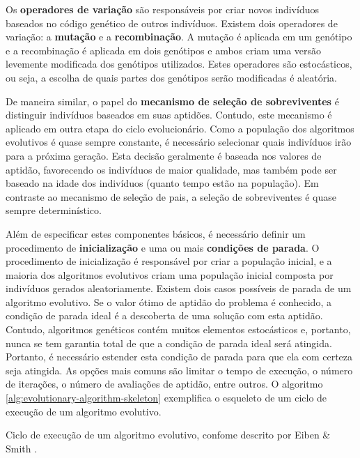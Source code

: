 Os \textbf{operadores de variação} são responsáveis por criar novos indivíduos
baseados no código genético de outros indivíduos. Existem dois operadores de
variação: a \textbf{mutação} e a \textbf{recombinação}. A mutação é aplicada em
um genótipo e a recombinação é aplicada em dois genótipos e ambos criam uma
versão levemente modificada dos genótipos utilizados. Estes operadores são
estocásticos, ou seja, a escolha de quais partes dos genótipos serão modificadas
é aleatória.

De maneira similar, o papel do \textbf{mecanismo de seleção de sobreviventes} é
distinguir indivíduos baseados em suas aptidões. Contudo, este mecanismo é
aplicado em outra etapa do ciclo evolucionário. Como a população dos algoritmos
evolutivos é quase sempre constante, é necessário selecionar quais indivíduos
irão para a próxima geração. Esta decisão geralmente é baseada nos valores de
aptidão, favorecendo os indivíduos de maior qualidade, mas também pode ser
baseado na idade dos indivíduos (quanto tempo estão na população). Em contraste
ao mecanismo de seleção de pais, a seleção de sobreviventes é quase sempre
determinístico.

Além de especificar estes componentes básicos, é necessário definir um
procedimento de \textbf{inicialização} e uma ou mais \textbf{condições de
parada}. O procedimento de inicialização é responsável por criar a população
inicial, e a maioria dos algoritmos evolutivos criam uma população inicial
composta por indivíduos gerados aleatoriamente. Existem dois casos possíveis de
parada de um algoritmo evolutivo. Se o valor ótimo de aptidão do problema é
conhecido, a condição de parada ideal é a descoberta de uma solução com esta
aptidão. Contudo, algoritmos genéticos contém muitos elementos estocásticos e,
portanto, nunca se tem garantia total de que a condição de parada ideal será
atingida. Portanto, é necessário estender esta condição de parada para que ela
com certeza seja atingida. As opções mais comuns são limitar o tempo de
execução, o número de iterações, o número de avaliações de aptidão, entre
outros. O algoritmo \ref{alg:evolutionary-algorithm-skeleton} exemplifica o
esqueleto de um ciclo de execução de um algoritmo evolutivo.

\begin{algorithm}[h]
\begin{center}
	\begin{algorithmic}[1]
		\REPEAT
    \end{algorithmic}
\end{center}
\caption{Ciclo de execução de um algoritmo evolutivo, confome descrito por Eiben
\& Smith \cite{IntroEvolComputing}.}
\label{alg:evolutionary-algorithm-skeleton}
\end{algorithm}

